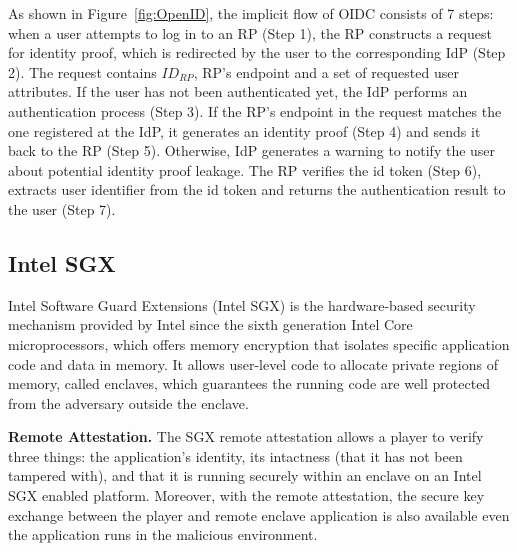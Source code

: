 As shown in Figure~\ref{fig:OpenID}, the implicit flow of OIDC consists of 7 steps: when a user attempts to log in to an RP (Step 1), the RP constructs a request for identity proof, which is redirected by the user to the corresponding IdP (Step 2). The request contains $ID_{RP}$, RP's endpoint and a set of requested user attributes. If the user has not been authenticated yet, the IdP performs an authentication process (Step 3). If the RP's endpoint in the request matches the one registered at the IdP, it generates an identity proof (Step 4) and sends it back to the RP (Step 5). Otherwise, IdP generates a warning to notify the user about potential identity proof leakage. The RP verifies the id token (Step 6), extracts user identifier from the id token and returns the authentication result to the user (Step 7).

\subsection{Intel SGX}
Intel Software Guard Extensions (Intel SGX) is the hardware-based security  mechanism provided by Intel since the sixth generation Intel Core microprocessors, which offers memory encryption that isolates specific application code and data in memory.
It allows user-level code to allocate private regions of memory, called enclaves, which guarantees the running code are well protected from the adversary outside the enclave.
 
\noindent\textbf{Remote Attestation.} The SGX remote attestation allows a player to verify three things: the application's identity, its intactness (that it has not been tampered with), and that it is running securely within an enclave on an Intel SGX enabled platform. Moreover, with the remote attestation, the secure key exchange between the player and remote enclave application is also available even the application runs in the malicious environment.